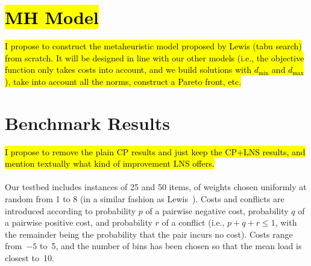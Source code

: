\documentclass{llncs}
\begin{document}

\section{\hl{MH Model}}
\label{sec:mh_model}

\hl{I propose to construct the metaheuristic model proposed by Lewis (tabu search) from scratch. It will be designed in line with our other models (i.e., the objective function only takes costs into account, and we build solutions with $d_{\min}$ and $d_{\max}$), take into account all the norms, construct a Pareto front, etc.}



\section{Benchmark Results}
\label{sec:benchmark_results}

\hl{I propose to remove the plain CP results and just keep the CP+LNS results, and mention textually what kind of improvement LNS offers.}

\paragraph{}Our testbed includes instances of 25 and 50 items, of weights chosen uniformly at random from 1 to 8 (in a similar fashion as Lewis~\cite{Lewis2013}). Costs and conflicts are introduced according to probability $p$ of a pairwise negative cost, probability $q$ of a pairwise positive cost, and probability $r$ of a conflict (i.e., $p+q+r \leq 1$, with the remainder being the probability that the pair incurs no cost). Costs range from~$-5$ to~5, and the number of bins has been chosen so that the mean load is closest to~10.
\end{document}
